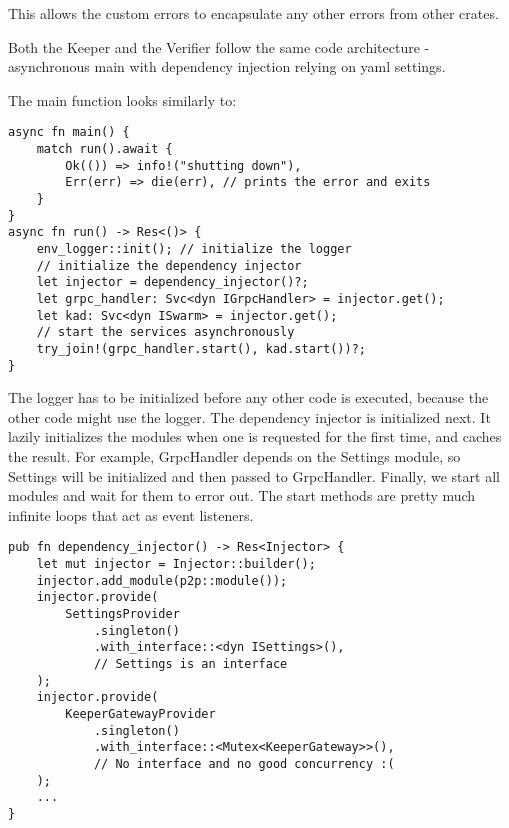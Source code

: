 \documentclass[ twoside,openright,titlepage,numbers=noenddot,headinclude,%
                footinclude=true,cleardoublepage=empty,abstractoff, %
                BCOR=5mm,paper=a4,fontsize=11pt,%
                ngerman,american,%
                ]{scrreprt}
\begin{document}
This allows the custom errors to encapsulate any other errors from other crates.

Both the Keeper and the Verifier follow the same code architecture - asynchronous main with dependency injection
relying on yaml settings.

The main function looks similarly to:
\begin{verbatim}
async fn main() {
    match run().await {
        Ok(()) => info!("shutting down"),
        Err(err) => die(err), // prints the error and exits
    }
}
async fn run() -> Res<()> {
    env_logger::init(); // initialize the logger
    // initialize the dependency injector
    let injector = dependency_injector()?; 
    let grpc_handler: Svc<dyn IGrpcHandler> = injector.get();
    let kad: Svc<dyn ISwarm> = injector.get();
    // start the services asynchronously
    try_join!(grpc_handler.start(), kad.start())?;
}
\end{verbatim}

The logger has to be initialized before any other code is executed,
because the other code might use the logger.
The dependency injector is initialized next.
It lazily initializes the modules when one is requested for the first time, and caches the result.
For example, GrpcHandler depends on the Settings module,
so Settings will be initialized and then passed to GrpcHandler.
Finally, we start all modules and wait for them to error out.
The start methods are pretty much infinite loops that act as event listeners.

\begin{verbatim}
pub fn dependency_injector() -> Res<Injector> {
    let mut injector = Injector::builder();
    injector.add_module(p2p::module());
    injector.provide(
        SettingsProvider
            .singleton()
            .with_interface::<dyn ISettings>(),
            // Settings is an interface
    );
    injector.provide(
        KeeperGatewayProvider
            .singleton()
            .with_interface::<Mutex<KeeperGateway>>(),
            // No interface and no good concurrency :(
    );
    ...
}
\end{verbatim}
\end{document}
